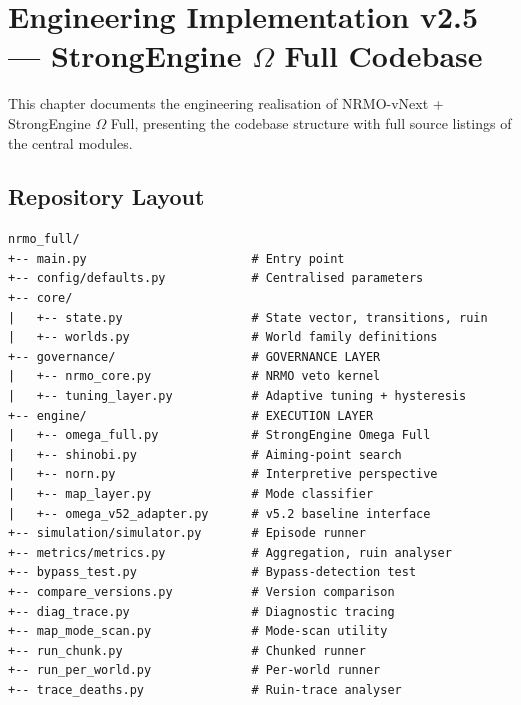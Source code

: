 
\chapter{Engineering Implementation v2.5 ---
StrongEngine $\Omega$ Full Codebase}
\label{ch:engineering-impl}



This chapter documents the engineering realisation of NRMO-vNext +
StrongEngine $\Omega$ Full, presenting the codebase structure with
full source listings of the central modules.

\section{Repository Layout}
\label{sec:impl-repo-layout}

\begin{lstlisting}[basicstyle=\ttfamily\scriptsize,frame=single]
nrmo_full/
+-- main.py                       # Entry point
+-- config/defaults.py            # Centralised parameters
+-- core/
|   +-- state.py                  # State vector, transitions, ruin
|   +-- worlds.py                 # World family definitions
+-- governance/                   # GOVERNANCE LAYER
|   +-- nrmo_core.py              # NRMO veto kernel
|   +-- tuning_layer.py           # Adaptive tuning + hysteresis
+-- engine/                       # EXECUTION LAYER
|   +-- omega_full.py             # StrongEngine Omega Full
|   +-- shinobi.py                # Aiming-point search
|   +-- norn.py                   # Interpretive perspective
|   +-- map_layer.py              # Mode classifier
|   +-- omega_v52_adapter.py      # v5.2 baseline interface
+-- simulation/simulator.py       # Episode runner
+-- metrics/metrics.py            # Aggregation, ruin analyser
+-- bypass_test.py                # Bypass-detection test
+-- compare_versions.py           # Version comparison
+-- diag_trace.py                 # Diagnostic tracing
+-- map_mode_scan.py              # Mode-scan utility
+-- run_chunk.py                  # Chunked runner
+-- run_per_world.py              # Per-world runner
+-- trace_deaths.py               # Ruin-trace analyser
\end{lstlisting}

